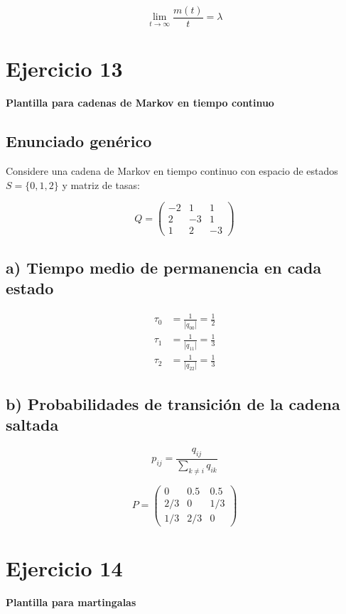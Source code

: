 \documentclass{article}
\begin{document}
\[
\lim_{t \to \infty} \frac{m(t)}{t} = \lambda
\]

\section*{Ejercicio 13}

\textbf{Plantilla para cadenas de Markov en tiempo continuo}

\subsection*{Enunciado genérico}
Considere una cadena de Markov en tiempo continuo con espacio de estados \(S = \{0, 1, 2\}\) y matriz de tasas:

\[
Q = \begin{pmatrix}
-2 & 1 & 1 \\
2 & -3 & 1 \\
1 & 2 & -3
\end{pmatrix}
\]

\subsection*{a) Tiempo medio de permanencia en cada estado}

\[
\begin{aligned}
\tau_0 &= \frac{1}{|q_{00}|} = \frac{1}{2} \\
\tau_1 &= \frac{1}{|q_{11}|} = \frac{1}{3} \\
\tau_2 &= \frac{1}{|q_{22}|} = \frac{1}{3}
\end{aligned}
\]

\subsection*{b) Probabilidades de transición de la cadena saltada}

\[
p_{ij} = \frac{q_{ij}}{\sum_{k \neq i} q_{ik}}
\]

\[
P = \begin{pmatrix}
0 & 0.5 & 0.5 \\
2/3 & 0 & 1/3 \\
1/3 & 2/3 & 0
\end{pmatrix}
\]

\section*{Ejercicio 14}

\textbf{Plantilla para martingalas}
\end{document}
